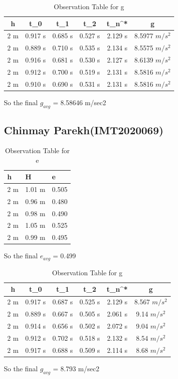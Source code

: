 \documentclass[11pt]{scrartcl} %
\begin{document}
\begin{table}[h]
\centering
\begin{tabular}{||c c c c c c||} 
\toprule
 \hline
 h & t_0 & t_1 & t_2 & t_n^* & g \\ [0.5ex] 
 \midrule
 \hline\hline
 2 m & 0.917 s & 0.685 s  & 0.527 s & 2.129 s & 8.5977 $m/s^2$  \\ 
 \hline
 2 m & 0.889 s & 0.710 s & 0.535 s & 2.134 s & 8.5575 $m/s^2$  \\
 \hline
 2 m & 0.916 s & 0.681 s & 0.530 s & 2.127 s  & 8.6139 $m/s^2$   \\
 \hline
 2 m & 0.912 s & 0.700 s & 0.519 s & 2.131 s  & 8.5816 $m/s^2$   \\
 \hline
 2 m & 0.910 s & 0.690 s & 0.531 s & 2.131 s  & 8.5816 $m/s^2$  \\ [1ex] 
 \bottomrule
 \hline
\end{tabular}
\caption{Observation Table for g}
\end{table}
So the final $g_{avg}$ = 8.58646 m/sec2

\newpage
\subsection{Chinmay Parekh(IMT2020069)}

\begin{table}[h] %
	\centering %
	\begin{tabular}{l l l}
		\toprule
		\textbf{h} & \textbf{H} & \textbf{e} \\
		\midrule
		2 m & 1.01 m & 0.505\\
        2 m & 0.96 m  & 0.480\\
        2 m & 0.98 m  & 0.490\\
        2 m & 1.05 m & 0.525 \\
        2 m & 0.99 m & 0.495 \\
		\bottomrule
	\end{tabular}
	\caption{Observation Table for e}
\end{table}
So the final $e_{avg}$ = 0.499

\begin{table}[h]
\centering
\begin{tabular}{||c c c c c c||} 
\toprule
 \hline
 h & t_0 & t_1 & t_2 & t_n^* & g \\ [0.5ex] 
 \midrule
 \hline\hline
 2 m & 0.917 s & 0.687 s  & 0.525 s & 2.129 s & 8.567 $m/s^2$  \\ 
 \hline
 2 m & 0.889 s & 0.667 s & 0.505 s & 2.061 s & 9.14 $m/s^2$  \\
 \hline 
 2 m & 0.914 s & 0.656 s & 0.502 s & 2.072 s  & 9.04 $m/s^2$   \\
 \hline
 2 m & 0.912 s & 0.702 s & 0.518 s & 2.132 s  & 8.54 $m/s^2$   \\
 \hline
 2 m & 0.917 s & 0.688 s & 0.509 s & 2.114 s  & 8.68 $m/s^2$  \\ 
 [1ex]
 \bottomrule
 \hline
\end{tabular}
\caption{Observation Table for g}
\end{table}
So the final $g_{avg}$ = 8.793 m/sec2
\newpage
\end{document}
